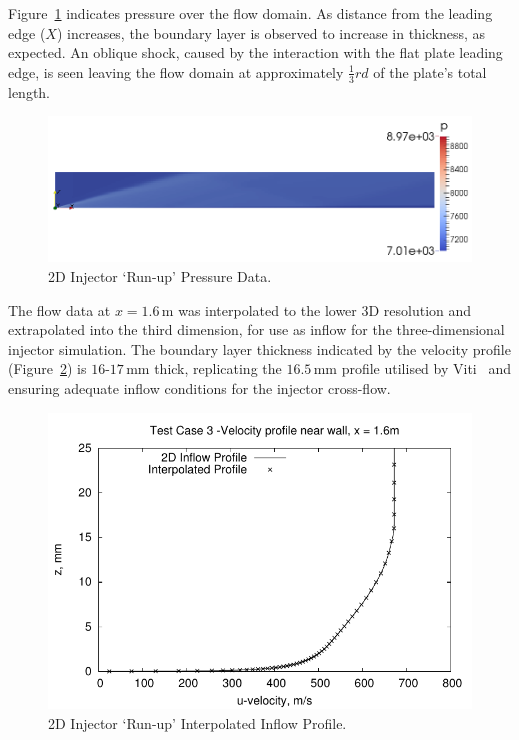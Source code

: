 Figure~\ref{f:tc3:runupmach} indicates pressure over the flow domain. As distance from the leading edge ($X$) increases, the boundary layer is observed to increase in thickness, as expected. An oblique shock, caused by the interaction with the flat plate leading edge, is seen leaving the flow domain at approximately $\frac{1}{3}rd$ of the plate's total length.
%
\begin{figure}[htbp]
 \begin{center}
  \includegraphics[width=14cm]{./chap8-3Dinjector/figs/inject-runup-pressure.png}
  \caption{2D Injector `Run-up' Pressure Data.}
  \label{f:tc3:runupmach}
 \end{center}
\end{figure}
%

The flow data at $x=1.6$\,m was interpolated to the lower 3D resolution and extrapolated into the third dimension, for use as inflow for the three-dimensional injector simulation. The boundary layer thickness indicated by the velocity profile (Figure~\ref{f:tc3:interpolatedprofile}) is $16$-$17$\,mm thick, replicating the $16.5$\,mm profile utilised by Viti~\cite{schetz2009} and ensuring adequate inflow conditions for the injector cross-flow.
%
\begin{figure}[htbp]
 \begin{center}
  \includegraphics[width=14cm]{./chap8-3Dinjector/figs/inject-runup-vel-profile.pdf}
  \caption{2D Injector `Run-up' Interpolated Inflow Profile.}
  \label{f:tc3:interpolatedprofile}
 \end{center}
\end{figure}
%

